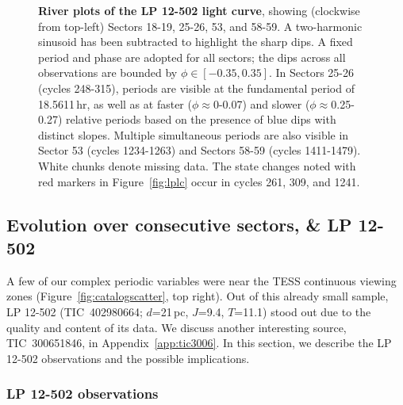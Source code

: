 \documentclass[11pt,twocolumn,tighten]{aastex63}
\begin{document}
\begin{figure*}[!t]
	\begin{center}
		\vspace{-0.2cm}
		
	\end{center}
	\vspace{-0.4cm}
	\caption{
    {\bf River plots of the LP 12-502 light curve}, showing (clockwise
    from top-left) Sectors 18-19, 25-26, 53, and 58-59.  A
    two-harmonic sinusoid has been subtracted to highlight the sharp
    dips.  A fixed period and phase are adopted for all sectors; the
    dips across all observations are bounded by $\phi \in
    [-0.35,0.35]$.  In Sectors 25-26 (cycles 248-315), periods are
    visible at the fundamental period of 18.5611\,hr, as well as at
    faster ($\phi$$\approx$0-0.07) and slower
    ($\phi$$\approx$0.25-0.27) relative periods based on the presence
    of blue dips with distinct slopes.  Multiple simultaneous periods
    are also visible in Sector 53 (cycles 1234-1263) and Sectors 58-59
    (cycles 1411-1479).  White chunks denote missing data.  The state
    changes noted with red markers in Figure~\ref{fig:lplc} occur in
    cycles 261, 309, and 1241.
	}
	\label{fig:lpriver0}
\end{figure*}


\subsection{Evolution over consecutive sectors, \& LP 12-502}

A few of our complex periodic variables were near the TESS continuous
viewing zones (Figure~\ref{fig:catalogscatter}, top right).  Out of
this already small sample, LP 12-502 (TIC~402980664; $d$=21\,pc,
$J$=9.4, $T$=11.1) stood out due to the quality and content of its
data.  We discuss another interesting source, TIC~300651846, in
Appendix~\ref{app:tic3006}.  In this section, we describe the LP
12-502 observations and the possible implications.


\subsubsection{LP 12-502 observations}
\label{subsec:lpobservations}
\end{document}
